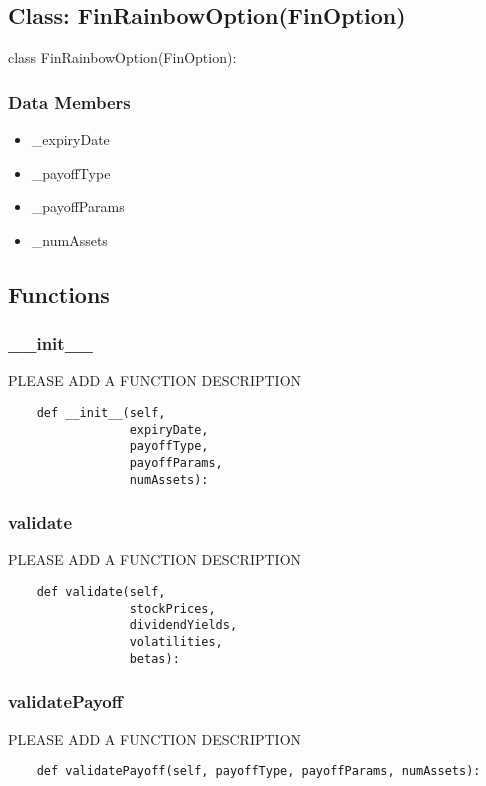 \documentclass[twoside,11pt]{book}
\begin{document}
\subsection*{Class: FinRainbowOption(FinOption)}
class FinRainbowOption(FinOption): 

\subsubsection*{Data Members}
\begin{itemize}
\item{\_expiryDate}
\item{\_payoffType}
\item{\_payoffParams}
\item{\_numAssets}
\end{itemize}

\subsection*{Functions}

\subsubsection*{{\bf \_\_init\_\_}}
PLEASE ADD A FUNCTION DESCRIPTION

\begin{lstlisting}
    def __init__(self,
                 expiryDate,
                 payoffType,
                 payoffParams,
                 numAssets):
\end{lstlisting}

\subsubsection*{{\bf validate}}
PLEASE ADD A FUNCTION DESCRIPTION

\begin{lstlisting}
    def validate(self,
                 stockPrices,
                 dividendYields,
                 volatilities,
                 betas):
\end{lstlisting}

\subsubsection*{{\bf validatePayoff}}
PLEASE ADD A FUNCTION DESCRIPTION

\begin{lstlisting}
    def validatePayoff(self, payoffType, payoffParams, numAssets):
\end{lstlisting}
\end{document}
